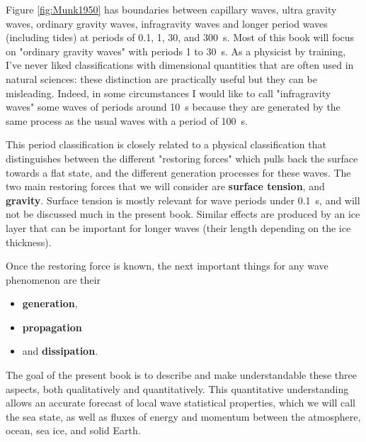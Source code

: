Figure \ref{fig:Munk1950} has boundaries between capillary waves, ultra gravity waves, ordinary gravity waves, infragravity waves and longer period waves (including tides) at periods of 0.1, 1, 30, and 300~s. Most of this book will focus on "ordinary gravity waves" with periods 1 to 30~s. As a physicist by training, I've never liked classifications with dimensional quantities that are often used in natural sciences: these distinction are practically useful but they can be misleading.  Indeed, in some circumstances I would like to call "infragravity waves" some waves of periods around 10~s because they are generated by the same process as the usual waves with a period of 100~s. 

This period classification is closely related to a physical classification that distinguishes 
between the different  "restoring forces" which pulls back the surface towards a flat state, and the different generation processes for these waves. 
The two main restoring forces that we will consider are  \textbf{surface tension}, and \textbf{gravity}. Surface tension is mostly relevant for wave periods under 0.1~s, and will not be discussed much in the present book. Similar effects are produced by an ice layer that can be important for longer waves (their length depending on the ice thickness).

Once the restoring force is known, the next important things for any wave phenomenon are their
\begin{itemize}
          \item \textbf{generation},
          \item \textbf{propagation} 
          \item and \textbf{dissipation}.
         \end{itemize}
The goal of the present book is to describe and make understandable these 
three aspects, both qualitatively and quantitatively. 
This quantitative understanding allows an accurate forecast of local wave statistical properties, which we will 
call the sea state, as well as fluxes of energy and momentum between the atmosphere, ocean, sea ice, and solid Earth. 



